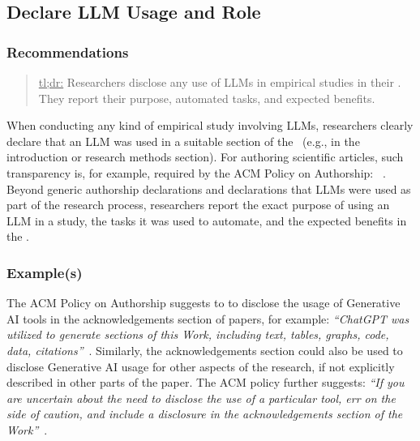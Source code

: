 



\subsection{Declare LLM Usage and Role}

\subsubsection{Recommendations}

\begin{quote}
\underline{tl;dr:} Researchers \must disclose any use of LLMs in empirical studies in their \paper. They \should report their purpose, automated tasks, and expected benefits.
\end{quote}

When conducting any kind of empirical study involving LLMs, researchers \must clearly declare that an LLM was used in a suitable section of the \paper~(e.g., in the introduction or research methods section).
For authoring scientific articles, such transparency is, for example, required by the ACM Policy on Authorship: ~\cite{ACM2023}.
Beyond generic authorship declarations and declarations that LLMs were used as part of the research process, researchers \should report the exact purpose of using an LLM in a study, the tasks it was used to automate, and the expected benefits in the \paper.


\subsubsection{Example(s)}

The ACM Policy on Authorship suggests to to disclose the usage of Generative AI tools in the acknowledgements section of papers, for example: \emph{``ChatGPT was utilized to generate sections of this Work, including text, tables, graphs, code, data, citations''}~\cite{ACM2023}. 
Similarly, the acknowledgements section could also be used to disclose Generative AI usage for other aspects of the research, if not explicitly described in other parts of the paper.
The ACM policy further suggests: \emph{``If you are uncertain ­about the need to disclose the use of a particular tool, err on the side of caution, and include a disclosure in the acknowledgements section of the Work''}~\cite{ACM2023}.

